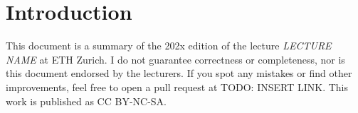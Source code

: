 \section{Introduction}

This document is a summary of the 202x edition of the lecture \textit{LECTURE NAME} at ETH Zurich. I do not guarantee correctness or completeness, nor is this document endorsed by the lecturers. If you spot any mistakes or find other improvements, feel free to open a pull request at TODO: INSERT LINK. This work is published as CC BY-NC-SA.
\begin{center}
	\ccbyncsa
\end{center}
